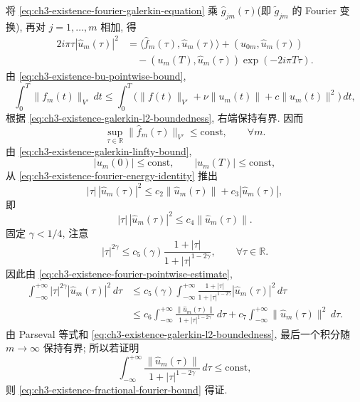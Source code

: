 将 \eqref{eq:ch3-existence-fourier-galerkin-equation} 乘 $\widehat g_{jm}(\tau)$(即 $\widetilde g_{jm}$ 的 Fourier 变换), 再对 $j=1,\ldots,m$ 相加, 得
\begin{equation}
\begin{aligned}
2i\pi\tau|\widehat u_m(\tau)|^2
&=\langle\widehat f_m(\tau),\widehat u_m(\tau)\rangle
+(u_{0m},\widehat u_m(\tau))\\
&\quad-(u_m(T),\widehat u_m(\tau))\exp(-2i\pi T\tau).
\end{aligned}
\label{eq:ch3-existence-fourier-energy-identity}
\end{equation}
由 \eqref{eq:ch3-existence-bu-pointwise-bound},
\[
\int_0^T\lVert f_m(t)\rVert_{V'}\,dt
\leq\int_0^T\bigl(\lVert f(t)\rVert_{V'}+\nu\lVert u_m(t)\rVert
+c\lVert u_m(t)\rVert^2\bigr)\,dt,
\]
根据 \eqref{eq:ch3-existence-galerkin-l2-boundedness}, 右端保持有界. 因而
\[
\sup_{\tau\in\mathbb R}\lVert\widehat f_m(\tau)\rVert_{V'}\leq\mathrm{const},
\qquad\forall m.
\]
由 \eqref{eq:ch3-existence-galerkin-linfty-bound},
\[
|u_m(0)|\leq\mathrm{const},
\qquad |u_m(T)|\leq\mathrm{const},
\]
从 \eqref{eq:ch3-existence-fourier-energy-identity} 推出
\[
|\tau|\,|\widehat u_m(\tau)|^2
\leq c_2\lVert\widehat u_m(\tau)\rVert+c_3|\widehat u_m(\tau)|,
\]
即
\begin{equation}
|\tau|\,|\widehat u_m(\tau)|^2
\leq c_4\lVert\widehat u_m(\tau)\rVert.
\label{eq:ch3-existence-fourier-pointwise-estimate}
\end{equation}
固定 $\gamma<1/4$, 注意
\[
|\tau|^{2\gamma}\leq c_5(\gamma)\frac{1+|\tau|}{1+|\tau|^{1-2\gamma}},
\qquad\forall\tau\in\mathbb R.
\]
因此由 \eqref{eq:ch3-existence-fourier-pointwise-estimate},
\[
\begin{aligned}
\int_{-\infty}^{+\infty}|\tau|^{2\gamma}|\widehat u_m(\tau)|^2\,d\tau
&\leq c_5(\gamma)\int_{-\infty}^{+\infty}
\frac{1+|\tau|}{1+|\tau|^{1-2\gamma}}|\widehat u_m(\tau)|^2\,d\tau\\
&\leq c_6\int_{-\infty}^{+\infty}
\frac{\lVert\widehat u_m(\tau)\rVert}{1+|\tau|^{1-2\gamma}}\,d\tau
+c_7\int_{-\infty}^{+\infty}\lVert\widehat u_m(\tau)\rVert^2\,d\tau.
\end{aligned}
\]
由 Parseval 等式和 \eqref{eq:ch3-existence-galerkin-l2-boundedness}, 最后一个积分随 $m\to\infty$ 保持有界; 所以若证明
\begin{equation}
\int_{-\infty}^{+\infty}
\frac{\lVert\widehat u_m(\tau)\rVert}{1+|\tau|^{1-2\gamma}}\,d\tau
\leq\mathrm{const},
\label{eq:ch3-existence-fourier-weighted-integral}
\end{equation}
则 \eqref{eq:ch3-existence-fractional-fourier-bound} 得证.

